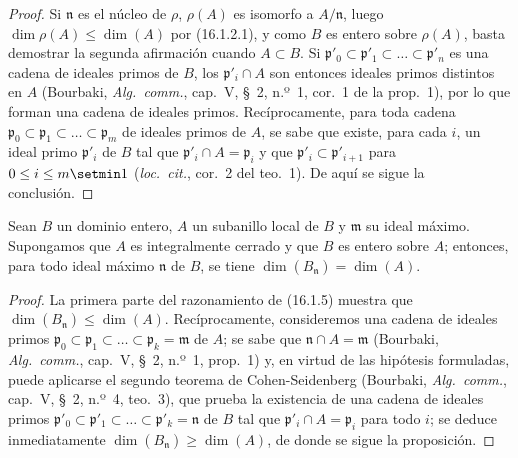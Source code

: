 \begin{proof}
Si $\mathfrak{n}$ es el núcleo de $\rho$, $\rho(A)$ es isomorfo a
$A/\mathfrak{n}$, luego $\dim\rho(A)\leq\dim(A)$ por (16.1.2.1), y como $B$
es entero sobre $\rho(A)$, basta demostrar la segunda afirmación cuando
$A\subset B$. Si
$\mathfrak{p}'_0\subset\mathfrak{p}'_1\subset\ldots\subset\mathfrak{p}'_n$
es una cadena de ideales primos de $B$, los $\mathfrak{p}'_i\cap A$ son
entonces ideales primos distintos en $A$ (Bourbaki, \emph{Alg.~comm.}, cap.~V,
\S~2, n.º~1, cor.~1 de la prop.~1), por lo que forman una cadena de ideales
primos. Recíprocamente, para toda cadena
$\mathfrak{p}_0\subset\mathfrak{p}_1\subset\ldots\subset\mathfrak{p}_m$
de ideales primos de $A$, se sabe que existe, para cada $i$, un ideal primo
$\mathfrak{p}'_i$ de $B$ tal que $\mathfrak{p}'_i\cap A=\mathfrak{p}_i$ y que
$\mathfrak{p}'_i\subset\mathfrak{p}'_{i+1}$ para $0\leq i\leq m\setmin 1$
(\emph{loc.~cit.}, cor.~2 del teo.~1). De aquí se sigue la conclusión.
\end{proof}

\begin{proposition}[16.1.6]
\label{0.16.1.6-fr}
Sean $B$ un dominio entero, $A$ un subanillo local de $B$ y $\mathfrak{m}$ su
ideal máximo. Supongamos que $A$ es integralmente cerrado y que $B$ es entero
sobre $A$; entonces, para todo ideal máximo $\mathfrak{n}$ de $B$, se tiene
$\dim(B_{\mathfrak{n}})=\dim(A)$.
\end{proposition}

\begin{proof}
La primera parte del razonamiento de (16.1.5) muestra que
$\dim(B_{\mathfrak{n}})\leq\dim(A)$. Recíprocamente, consideremos una cadena
de ideales primos
$\mathfrak{p}_0\subset\mathfrak{p}_1\subset\ldots\subset
\mathfrak{p}_k=\mathfrak{m}$ de $A$; se sabe que
$\mathfrak{n}\cap A=\mathfrak{m}$ (Bourbaki, \emph{Alg.~comm.}, cap.~V,
\S~2, n.º~1, prop.~1) y, en virtud de las hipótesis formuladas, puede aplicarse
el segundo teorema de Cohen-Seidenberg (Bourbaki, \emph{Alg.~comm.}, cap.~V,
\S~2, n.º~4, teo.~3), que prueba la existencia de una cadena de ideales primos
$\mathfrak{p}'_0\subset\mathfrak{p}'_1\subset\ldots\subset
\mathfrak{p}'_k=\mathfrak{n}$ de $B$ tal que
$\mathfrak{p}'_i\cap A=\mathfrak{p}_i$ para todo $i$; se deduce inmediatamente
$\dim(B_{\mathfrak{n}})\geq\dim(A)$, de donde se sigue la proposición.
\end{proof}

